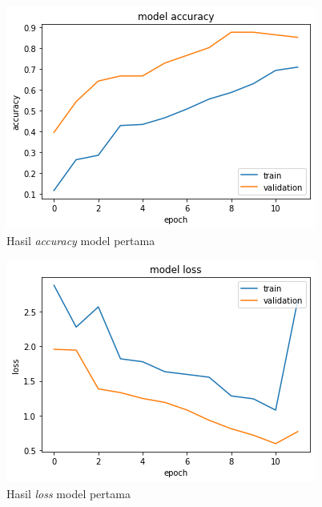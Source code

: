 \begin{figure}[H]
  \centering

  \includegraphics[scale=0.6]{gambar/bab4-uji-model-worst-acc.png}

  \caption{Hasil \emph{accuracy} model pertama}
  \label{fig:model1-train-acc}
\end{figure}

\begin{figure}[H]
  \centering

  \includegraphics[scale=0.6]{gambar/bab4-uji-model-worst-loss.png}

  \caption{Hasil \emph{loss} model pertama}
  \label{fig:model1-train-loss}
\end{figure}

